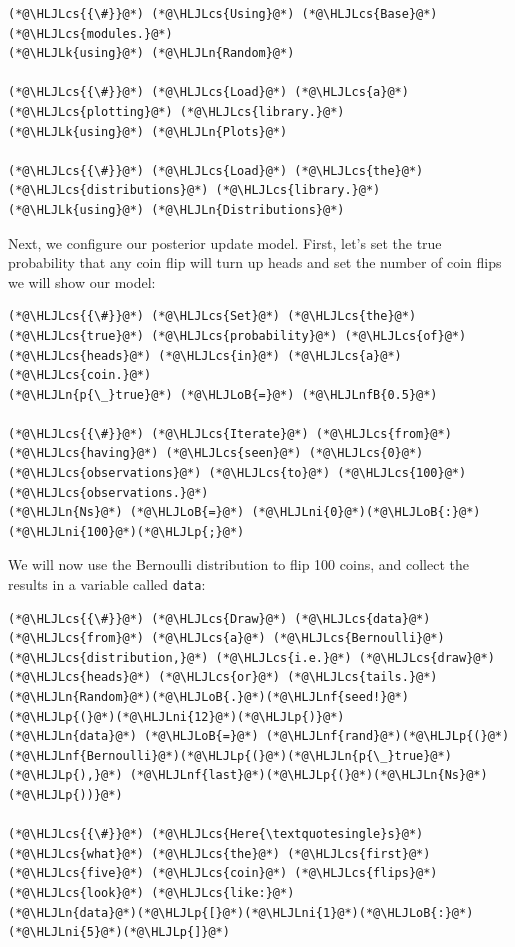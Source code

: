 \documentclass[12pt,a4paper]{article}
\newcommand{\HLJLk}[1]{\textcolor[RGB]{148,91,176}{\textbf{#1}}}
\newcommand{\HLJLn}[1]{#1}
\newcommand{\HLJLnf}[1]{\textcolor[RGB]{66,102,213}{#1}}
\newcommand{\HLJLnfB}[1]{\textcolor[RGB]{59,151,46}{#1}}
\newcommand{\HLJLni}[1]{\textcolor[RGB]{59,151,46}{#1}}
\newcommand{\HLJLoB}[1]{\textcolor[RGB]{102,102,102}{\textbf{#1}}}
\newcommand{\HLJLp}[1]{#1}
\newcommand{\HLJLcs}[1]{\textcolor[RGB]{153,153,119}{\textit{#1}}}
\begin{document}
\begin{lstlisting}
(*@\HLJLcs{{\#}}@*) (*@\HLJLcs{Using}@*) (*@\HLJLcs{Base}@*) (*@\HLJLcs{modules.}@*)
(*@\HLJLk{using}@*) (*@\HLJLn{Random}@*)

(*@\HLJLcs{{\#}}@*) (*@\HLJLcs{Load}@*) (*@\HLJLcs{a}@*) (*@\HLJLcs{plotting}@*) (*@\HLJLcs{library.}@*)
(*@\HLJLk{using}@*) (*@\HLJLn{Plots}@*)

(*@\HLJLcs{{\#}}@*) (*@\HLJLcs{Load}@*) (*@\HLJLcs{the}@*) (*@\HLJLcs{distributions}@*) (*@\HLJLcs{library.}@*)
(*@\HLJLk{using}@*) (*@\HLJLn{Distributions}@*)
\end{lstlisting}


Next, we configure our posterior update model. First, let's set the true probability that any coin flip will turn up heads and set the number of coin flips we will show our model:


\begin{lstlisting}
(*@\HLJLcs{{\#}}@*) (*@\HLJLcs{Set}@*) (*@\HLJLcs{the}@*) (*@\HLJLcs{true}@*) (*@\HLJLcs{probability}@*) (*@\HLJLcs{of}@*) (*@\HLJLcs{heads}@*) (*@\HLJLcs{in}@*) (*@\HLJLcs{a}@*) (*@\HLJLcs{coin.}@*)
(*@\HLJLn{p{\_}true}@*) (*@\HLJLoB{=}@*) (*@\HLJLnfB{0.5}@*)

(*@\HLJLcs{{\#}}@*) (*@\HLJLcs{Iterate}@*) (*@\HLJLcs{from}@*) (*@\HLJLcs{having}@*) (*@\HLJLcs{seen}@*) (*@\HLJLcs{0}@*) (*@\HLJLcs{observations}@*) (*@\HLJLcs{to}@*) (*@\HLJLcs{100}@*) (*@\HLJLcs{observations.}@*)
(*@\HLJLn{Ns}@*) (*@\HLJLoB{=}@*) (*@\HLJLni{0}@*)(*@\HLJLoB{:}@*)(*@\HLJLni{100}@*)(*@\HLJLp{;}@*)
\end{lstlisting}


We will now use the Bernoulli distribution to flip 100 coins, and collect the results in a variable called \texttt{data}:


\begin{lstlisting}
(*@\HLJLcs{{\#}}@*) (*@\HLJLcs{Draw}@*) (*@\HLJLcs{data}@*) (*@\HLJLcs{from}@*) (*@\HLJLcs{a}@*) (*@\HLJLcs{Bernoulli}@*) (*@\HLJLcs{distribution,}@*) (*@\HLJLcs{i.e.}@*) (*@\HLJLcs{draw}@*) (*@\HLJLcs{heads}@*) (*@\HLJLcs{or}@*) (*@\HLJLcs{tails.}@*)
(*@\HLJLn{Random}@*)(*@\HLJLoB{.}@*)(*@\HLJLnf{seed!}@*)(*@\HLJLp{(}@*)(*@\HLJLni{12}@*)(*@\HLJLp{)}@*)
(*@\HLJLn{data}@*) (*@\HLJLoB{=}@*) (*@\HLJLnf{rand}@*)(*@\HLJLp{(}@*)(*@\HLJLnf{Bernoulli}@*)(*@\HLJLp{(}@*)(*@\HLJLn{p{\_}true}@*)(*@\HLJLp{),}@*) (*@\HLJLnf{last}@*)(*@\HLJLp{(}@*)(*@\HLJLn{Ns}@*)(*@\HLJLp{))}@*)

(*@\HLJLcs{{\#}}@*) (*@\HLJLcs{Here{\textquotesingle}s}@*) (*@\HLJLcs{what}@*) (*@\HLJLcs{the}@*) (*@\HLJLcs{first}@*) (*@\HLJLcs{five}@*) (*@\HLJLcs{coin}@*) (*@\HLJLcs{flips}@*) (*@\HLJLcs{look}@*) (*@\HLJLcs{like:}@*)
(*@\HLJLn{data}@*)(*@\HLJLp{[}@*)(*@\HLJLni{1}@*)(*@\HLJLoB{:}@*)(*@\HLJLni{5}@*)(*@\HLJLp{]}@*)
\end{lstlisting}
\end{document}
